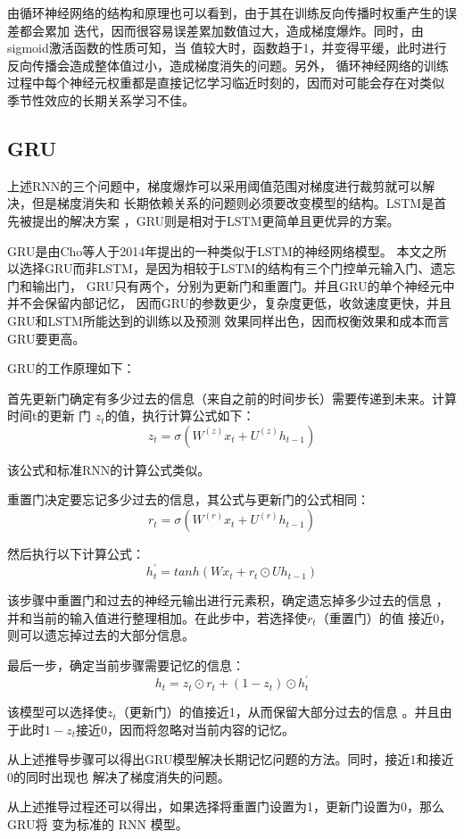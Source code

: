 \documentclass[AutoFakeBold]{LZUThesis}
\begin{document}
由循环神经网络的结构和原理也可以看到，由于其在训练反向传播时权重产生的误差都会累加
迭代，因而很容易误差累加数值过大，造成梯度爆炸。同时，由sigmoid激活函数的性质可知，当
值较大时，函数趋于1，并变得平缓，此时进行反向传播会造成整体值过小，造成梯度消失的问题。另外，
循环神经网络的训练过程中每个神经元权重都是直接记忆学习临近时刻的，因而对可能会存在对类似
季节性效应的长期关系学习不佳。

\subsection{GRU}
上述RNN的三个问题中，梯度爆炸可以采用阈值范围对梯度进行裁剪就可以解决，但是梯度消失和
长期依赖关系的问题则必须要改变模型的结构。LSTM是首先被提出的解决方案
\cite{hochreiter1997long}，GRU则是相对于LSTM更简单且更优异的方案。

GRU是由Cho等人于2014年提出的一种类似于LSTM的神经网络模型\cite{cho2014learning}。
本文之所以选择GRU而非LSTM，是因为相较于LSTM的结构有三个门控单元输入门、遗忘门和输出门，
GRU只有两个，分别为更新门和重置门。并且GRU的单个神经元中并不会保留内部记忆，
因而GRU的参数更少，复杂度更低，收敛速度更快，并且GRU和LSTM所能达到的训练以及预测
效果同样出色，因而权衡效果和成本而言GRU要更高\cite{chung2014empirical}。

GRU的工作原理如下：

首先更新门确定有多少过去的信息（来自之前的时间步长）需要传递到未来。计算时间t的更新
门 $z_t$的值，执行计算公式如下：
$$z_t=\sigma(W^{(z)}x_t+U^{(z)}h_{t-1})$$

该公式和标准RNN的计算公式类似。

重置门决定要忘记多少过去的信息，其公式与更新门的公式相同：
$$r_t=\sigma(W^{(r)}x_t+U^{(r)}h_{t-1})$$

然后执行以下计算公式：
$$h^{\prime}_t=tanh(Wx_t+r_t\odot Uh_{t-1})$$

该步骤中重置门和过去的神经元输出进行元素积，确定遗忘掉多少过去的信息
，并和当前的输入值进行整理相加。在此步中，若选择使$r_t$（重置门）的值
接近0，则可以遗忘掉过去的大部分信息。

最后一步，确定当前步骤需要记忆的信息：
$$h_t=z_t\odot r_t+(1-z_t)\odot h^{\prime}_t$$

该模型可以选择使$z_t$（更新门）的值接近1，从而保留大部分过去的信息
。并且由于此时$1-z_t$接近0，因而将忽略对当前内容的记忆。

从上述推导步骤可以得出GRU模型解决长期记忆问题的方法。同时，接近1和接近0的同时出现也
解决了梯度消失的问题。

从上述推导过程还可以得出，如果选择将重置门设置为1，更新门设置为0，那么GRU将
变为标准的 RNN 模型。
\end{document}
